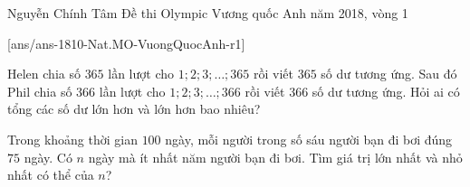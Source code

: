 
\begin{name}
{Nguyễn Chính Tâm}
{Đề thi Olympic Vương quốc Anh năm 2018, vòng 1}%
\end{name}
\setcounter{ex}{0}
[ans/ans-1810-Nat.MO-VuongQuocAnh-r1]
\begin{ex}%
Helen chia số $365$ lần lượt cho $1;2;3;\ldots;365$ rồi viết $365$ số dư tương ứng. Sau đó Phil chia số $366$ lần lượt cho $1;2;3;\ldots;366$ rồi viết $366$ số dư tương ứng. Hỏi ai có tổng các số dư lớn hơn và lớn hơn bao nhiêu?
\end{ex}
\begin{ex}%
Trong khoảng thời gian $100$ ngày, mỗi người trong số sáu người bạn đi bơi đúng $75$ ngày. Có $n$ ngày mà ít nhất năm người bạn đi bơi. Tìm giá trị lớn nhất và nhỏ nhất có thể của $n$?
\end{ex}
